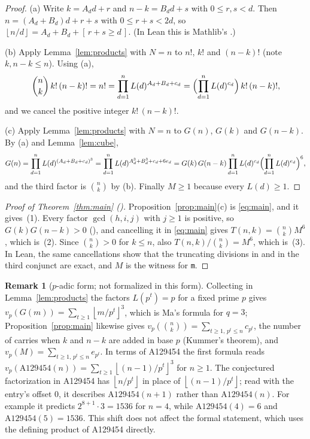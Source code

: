 \documentclass[11pt]{amsart}
\theoremstyle{plain}
\theoremstyle{definition}
\newtheorem{remark}[theorem]{Remark}
\newcommand{\fl}[1]{\left\lfloor #1\right\rfloor}
\newcommand{\Ind}[1]{[\,#1\,]}
\begin{document}
\begin{proof}
(a) Write $k=A_dd+r$ and $n-k=B_dd+s$ with $0\le r,s<d$. Then $n=(A_d+B_d)d+r+s$ with $0\le r+s<2d$, so $\fl{n/d}=A_d+B_d+\Ind{r+s\ge d}$. (In Lean this is Mathlib's .)

(b) Apply Lemma~\ref{lem:products} with $N=n$ to $n!$, $k!$ and $(n-k)!$ (note $k,n-k\le n$). Using (a),
\[
  \binom nk\,k!\,(n-k)!=n!=\prod_{d=1}^nL(d)^{A_d+B_d+c_d}=\Bigl(\prod_{d=1}^nL(d)^{c_d}\Bigr)\,k!\,(n-k)!,
\]
and we cancel the positive integer $k!\,(n-k)!$.

(c) Apply Lemma~\ref{lem:products} with $N=n$ to $G(n)$, $G(k)$ and $G(n-k)$. By (a) and Lemma~\ref{lem:cube},
\[
  G(n)=\prod_{d=1}^nL(d)^{(A_d+B_d+c_d)^3}=\prod_{d=1}^nL(d)^{A_d^3+B_d^3+c_d+6e_d}
  =G(k)\,G(n-k)\prod_{d=1}^nL(d)^{c_d}\Bigl(\prod_{d=1}^nL(d)^{e_d}\Bigr)^6,
\]
and the third factor is $\binom nk$ by (b). Finally $M\ge1$ because every $L(d)\ge1$.
\end{proof}

\begin{proof}[Proof of Theorem~\ref{thm:main} ()]
Proposition~\ref{prop:main}(c) is \eqref{eq:main}, and it gives~(1). Every factor $\gcd(h,i,j)$ with $j\ge1$ is positive, so $G(k)G(n-k)>0$ (), and cancelling it in \eqref{eq:main} gives $T(n,k)=\binom nkM^6$, which is~(2). Since $\binom nk>0$ for $k\le n$, also $T(n,k)/\binom nk=M^6$, which is~(3). In Lean, the same cancellations show that the truncating divisions in  and in the third conjunct are exact, and $M$ is the witness for \texttt{m}.
\end{proof}

\begin{remark}[$p$-adic form; not formalized in this form]\label{rem:padic}
Collecting in Lemma~\ref{lem:products} the factors $L(p^t)=p$ for a fixed prime $p$ gives $v_p(G(m))=\sum_{t\ge1}\fl{m/p^t}^3$, which is Ma's formula for $q=3$; Proposition~\ref{prop:main} likewise gives $v_p(\binom nk)=\sum_{t\ge1,\,p^t\le n}c_{p^t}$, the number of carries when $k$ and $n-k$ are added in base $p$ (Kummer's theorem), and $v_p(M)=\sum_{t\ge1,\,p^t\le n}e_{p^t}$. In terms of A129454 the first formula reads $v_p(\mathrm{A129454}(n))=\sum_{t\ge1}\fl{(n-1)/p^t}^3$ for $n\ge1$. The conjectured factorization in A129454 \cite{A129454} has $\fl{n/p^t}$ in place of $\fl{(n-1)/p^t}$; read with the entry's offset $0$, it describes $\mathrm{A129454}(n+1)$ rather than $\mathrm{A129454}(n)$. For example it predicts $2^{8+1}\cdot3=1536$ for $n=4$, while $\mathrm{A129454}(4)=6$ and $\mathrm{A129454}(5)=1536$. This shift does not affect the formal statement, which uses the defining product of A129454 directly.
\end{remark}
\end{document}
